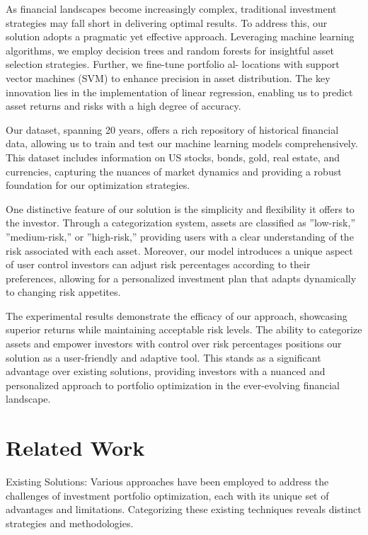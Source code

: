 \documentclass[conference]{IEEEtran}
\begin{document}
As financial landscapes become increasingly complex, traditional investment strategies may fall short in delivering optimal results. To address this, our solution adopts a pragmatic yet effective approach. Leveraging machine learning algorithms, we employ decision trees and random forests for insightful asset selection strategies. Further, we fine-tune portfolio al- locations with support vector machines (SVM) to enhance precision in asset distribution. The key innovation lies in the implementation of linear regression, enabling us to predict asset returns and risks with a high degree of accuracy.

Our dataset, spanning 20 years, offers a rich repository of historical financial data, allowing us to train and test our machine learning models comprehensively. This dataset includes information on US stocks, bonds, gold, real estate, and currencies, capturing the nuances of market dynamics and providing a robust foundation for our optimization strategies.

One distinctive feature of our solution is the simplicity and flexibility it offers to the investor. Through a categorization system, assets are classified as ”low-risk,” ”medium-risk,” or ”high-risk,” providing users with a clear understanding of the risk associated with each asset. Moreover, our model introduces a unique aspect of user control investors can adjust risk percentages according to their preferences, allowing for a personalized investment plan that adapts dynamically to changing risk appetites.

The experimental results demonstrate the efficacy of our approach, showcasing superior returns while maintaining acceptable risk levels. The ability to categorize assets and empower investors with control over risk percentages positions our solution as a user-friendly and adaptive tool. This stands as a significant advantage over existing solutions, providing investors with a nuanced and personalized approach to portfolio optimization in the ever-evolving financial landscape.


\section{Related Work}
Existing Solutions:
Various approaches have been employed to address the challenges of investment portfolio optimization, each with its unique set of advantages and limitations. Categorizing these existing techniques reveals distinct strategies and methodologies.
\end{document}

